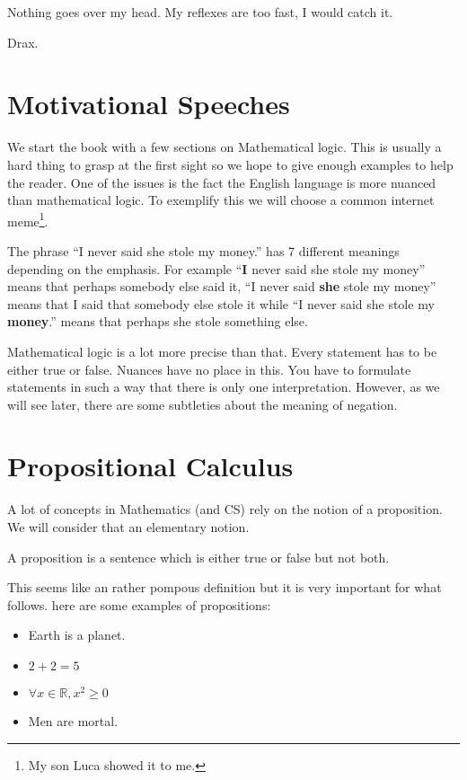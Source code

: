 \epigraph{Nothing goes over my head. My reflexes are too fast, I would catch it.}{ Drax.}

\section{Motivational Speeches}
We start the book with a  few sections on Mathematical logic. This is usually a hard thing to grasp at the first sight so we hope to give enough examples to help the reader.
One of the issues is the fact the English language is more nuanced than mathematical logic. To exemplify this we will choose a common   internet meme\footnote{My son Luca showed it to me.}. 

The phrase
``I never said she stole my money.'' has 7 different meanings depending on the emphasis. For example ``{\bf I } never said she stole my money'' means that perhaps somebody else said it, ``I never said {\bf she} stole my money'' means that I said that somebody else stole it  while ``I never said she stole my {\bf money}.'' means that perhaps she stole something else.

 Mathematical logic is a lot more precise than that. Every statement has to be either true or false. Nuances have no place in this. You have to formulate statements in such a way that there is only one interpretation. However, as we will see later, there are some subtleties about the meaning of negation.



\section{Propositional Calculus}

A lot of concepts in Mathematics (and CS) rely on the notion of a proposition. We will consider that an elementary notion.

\begin{Definition}
A proposition is a sentence which is either true or false but not both.
\end{Definition}

This seems like an rather pompous definition but it is very important for what follows. here are some examples of propositions:
\begin{itemize}
\item Earth is a planet.
\item $2+2=5$
\item $\forall x \in \mathbb{R}, x^2 \ge 0$
\item Men are mortal.
\end{itemize}

